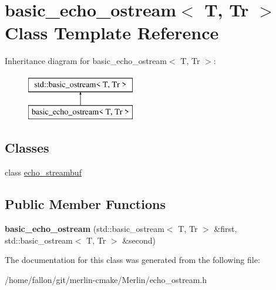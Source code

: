 \hypertarget{classbasic__echo__ostream}{}\section{basic\+\_\+echo\+\_\+ostream$<$ T, Tr $>$ Class Template Reference}
\label{classbasic__echo__ostream}
Inheritance diagram for basic\+\_\+echo\+\_\+ostream$<$ T, Tr $>$\+:\begin{figure}[H]
\begin{center}
\leavevmode
\includegraphics[height=2.000000cm]{classbasic__echo__ostream}
\end{center}
\end{figure}
\subsection*{Classes}
\begin{DoxyCompactItemize}
\item 
class \hyperlink{classbasic__echo__ostream_1_1echo__streambuf}{echo\+\_\+streambuf}
\end{DoxyCompactItemize}
\subsection*{Public Member Functions}
\begin{DoxyCompactItemize}
\item 
\mbox{\label{classbasic__echo__ostream_adef0dcc882ca8eb0b503ffcdc4bf2958}} 
{\bfseries basic\+\_\+echo\+\_\+ostream} (std\+::basic\+\_\+ostream$<$ T, Tr $>$ \&first, std\+::basic\+\_\+ostream$<$ T, Tr $>$ \&second)
\end{DoxyCompactItemize}


The documentation for this class was generated from the following file\+:\begin{DoxyCompactItemize}
\item 
/home/fallon/git/merlin-\/cmake/\+Merlin/echo\+\_\+ostream.\+h\end{DoxyCompactItemize}

